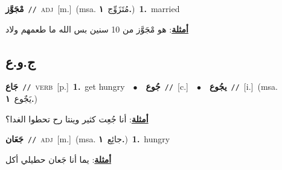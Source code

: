 \documentclass[10pt,a4paper,twoside]{article} %
\begin{document}
\begin{multicols}{2}
{\setlength\topsep{0pt}\textbf{\foreignlanguage{arabic}{مْجَوَّز}}\ {\color{gray}\texttt{//}\color{black}}\ \textsc{adj}\ [m.]\ \color{gray}(msa. \foreignlanguage{arabic}{مُتَزَوِّج}~\foreignlanguage{arabic}{\textbf{١.}})\color{black}\ \textbf{1.}~married\  \begin{flushright}\color{gray}\foreignlanguage{arabic}{\textbf{\underline{\foreignlanguage{arabic}{أمثلة}}}: هو مْجَوَّز من 10 سنين بس الله ما طعمهم ولاد}\end{flushright}\color{black}} \vspace{2mm}

\vspace{-3mm}
\subsection*{\color{blue}\foreignlanguage{arabic}{ج.و.ع}\color{blue}{}} 

{\setlength\topsep{0pt}\textbf{\foreignlanguage{arabic}{جَاع}}\ {\color{gray}\texttt{//}\color{black}}\ \textsc{verb}\ [p.]\ \textbf{1.}~get hungry\ \ $\bullet$\ \ \setlength\topsep{0pt}\textbf{\foreignlanguage{arabic}{جُوع}}\ {\color{gray}\texttt{//}\color{black}}\ [c.]\ \ $\bullet$\ \ \setlength\topsep{0pt}\textbf{\foreignlanguage{arabic}{يجُوع}}\ {\color{gray}\texttt{//}\color{black}}\ [i.]\ \color{gray}(msa. \foreignlanguage{arabic}{يَجٌوع}~\foreignlanguage{arabic}{\textbf{١.}})\color{black}\  \begin{flushright}\color{gray}\foreignlanguage{arabic}{\textbf{\underline{\foreignlanguage{arabic}{أمثلة}}}: أنا جُعِت كثير وينتا رح تحطوا الغدا؟}\end{flushright}\color{black}} \vspace{2mm}

{\setlength\topsep{0pt}\textbf{\foreignlanguage{arabic}{جَعَان}}\ {\color{gray}\texttt{//}\color{black}}\ \textsc{adj}\ [m.]\ \color{gray}(msa. \foreignlanguage{arabic}{جائِع}~\foreignlanguage{arabic}{\textbf{١.}})\color{black}\ \textbf{1.}~hungry\  \begin{flushright}\color{gray}\foreignlanguage{arabic}{\textbf{\underline{\foreignlanguage{arabic}{أمثلة}}}: يما أنا جَعان حطيلي أكل}\end{flushright}\color{black}} \vspace{2mm}


\end{multicols}
\end{document}
